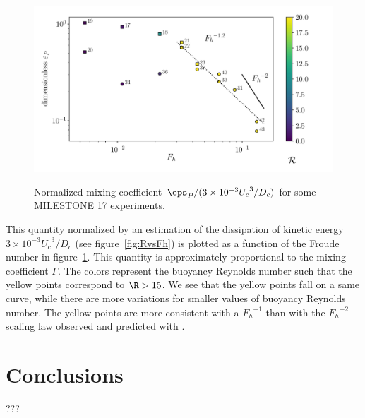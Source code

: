 \begin{figure}[htp!]
\includegraphics[width=\figwidth]{tmp/fig_dt_pot_energy}
\label{fig:dt:pot:energy}

\caption{Normalized mixing coefficient $\eps_P / (3\times10^{-3} {U_c}^3/D_c)$
for some MILESTONE 17 experiments.}

\end{figure}

This quantity normalized by an estimation of the dissipation of kinetic energy
$3\times10^{-3} {U_c}^3/D_c$ (see figure~\ref{fig:RvsFh}) is plotted as a
function of the Froude number in figure~\ref{fig:dt:pot:energy}. This quantity
is approximately proportional to the mixing coefficient $\Gamma$. The colors
represent the buoyancy Reynolds number such that the yellow points correspond
to $\R > 15$. We see that the yellow points fall on a same curve, while there
are more variations for smaller values of buoyancy Reynolds number. The yellow
points are more consistent with a ${F_h}^{-1}$ than with the ${F_h}^{-2}$
scaling law observed and predicted with \cite{Maffioli2016}.

\section{Conclusions}

???
